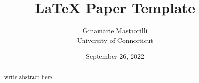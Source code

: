 \documentclass[12pt]{article}
\title{LaTeX Paper Template}
\author{Ginamarie Mastrorilli\\
    University of Connecticut
}
\date{September 26, 2022}
\begin{document}
\maketitle

\begin{abstract}
write abstract here
\end{abstract}
\end{document}
